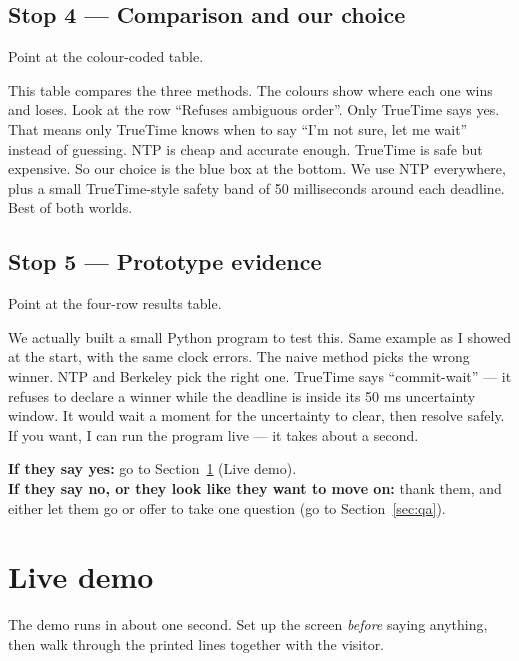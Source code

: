 \documentclass[a4paper,11pt]{article}
\begin{document}
\subsection{Stop 4 --- Comparison and our choice}

Point at the colour-coded table.

\begin{spoken}
This table compares the three methods. The colours show where
each one wins and loses. Look at the row ``Refuses ambiguous
order''. Only TrueTime says yes. That means only TrueTime knows
when to say ``I'm not sure, let me wait'' instead of guessing.
NTP is cheap and accurate enough. TrueTime is safe but expensive.
So our choice is the blue box at the bottom. We use NTP
everywhere, plus a small TrueTime-style safety band of 50
milliseconds around each deadline. Best of both worlds.
\end{spoken}

\subsection{Stop 5 --- Prototype evidence}

Point at the four-row results table.

\begin{spoken}
We actually built a small Python program to test this. Same
example as I showed at the start, with the same clock errors. The
naive method picks the wrong winner. NTP and Berkeley pick the
right one. TrueTime says ``commit-wait'' --- it refuses to declare
a winner while the deadline is inside its 50 ms uncertainty
window. It would wait a moment for the uncertainty to clear, then
resolve safely. If you want, I can run the program live --- it
takes about a second.
\end{spoken}

\textbf{If they say yes:} go to Section~\ref{sec:demo} (Live
demo).\\
\textbf{If they say no, or they look like they want to move on:}
thank them, and either let them go or offer to take one question
(go to Section~\ref{sec:qa}).

\newpage

\section{Live demo}\label{sec:demo}

The demo runs in about one second. Set up the screen \emph{before}
saying anything, then walk through the printed lines together with
the visitor.
\end{document}
